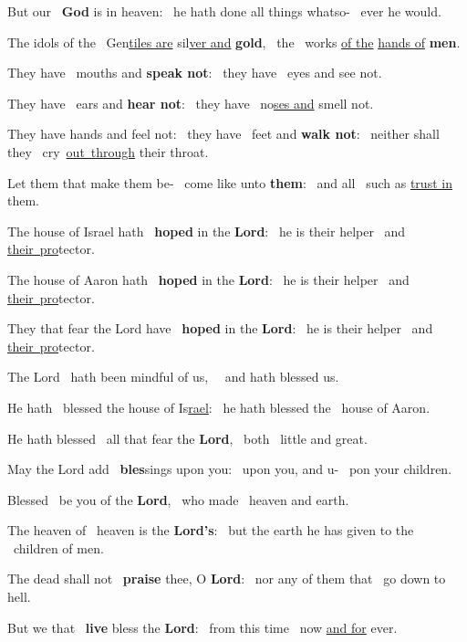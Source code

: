 \documentclass[12pt]{article} %
\newenvironment{psalmtext}{\leftskip 0.25in}{\vspace{2 mm}}
\def\pipe{\textcolor{benred8}{\textdoublepipe}}
\let\oldgresixstar\gresixstar
\renewcommand{\gresixstar}{\textcolor{benred8}{\oldgresixstar}}
\let\oldgredagger\gredagger
\renewcommand{\gredagger}{\textcolor{benred8}{\oldgredagger}}
\begin{document}
\begin{pages}
\begin{Rightside}
\begin{psalmtext}
But our \pipe\ \textbf{God} is in heaven: \gresixstar\ he hath done all things whatso- \pipe\ ever he would.

The idols of the \pipe\ Gen\uline{tiles are} sil\uline{ver and} \textbf{gold}, \gresixstar\ the \pipe\ works \uline{of the} \uline{hands of} \textbf{men}.

They have \pipe\ mouths and \textbf{speak not}: \gresixstar\ they have \pipe\ eyes and see not.

They have \pipe\ ears and \textbf{hear not}: \gresixstar\ they have \pipe\ no\uline{ses and} smell not.

They have hands and feel not: \gredagger\ they have \pipe\ feet and \textbf{walk not}: \gresixstar\ neither shall they \pipe\ cry~\uline{out~through} their throat.

Let them that make them be- \pipe\ come like unto \textbf{them}: \gresixstar\ and all \pipe\ such as \uline{trust in} them.

The house of Israel hath \pipe\ \textbf{hoped} in the \textbf{Lord}: \gresixstar\ he is their helper \pipe\ and \uline{their~pro}tector.

The house of Aaron hath \pipe\ \textbf{hoped} in the \textbf{Lord}: \gresixstar\ he is their helper \pipe\ and \uline{their~pro}tector.

They that fear the Lord have \pipe\ \textbf{hoped} in the \textbf{Lord}: \gresixstar\ he is their helper \pipe\ and \uline{their~pro}tector.

The Lord \pipe\ hath been mindful of us, \gresixstar\ \pipe\ and hath blessed us.

He hath \pipe\ blessed the house of Is\uline{rael}: \gresixstar\ he hath blessed the \pipe\ house of Aaron.

He hath blessed \pipe\ all that fear the \textbf{Lord}, \gresixstar\ both \pipe\ little and great.

May the Lord add \pipe\ \textbf{bles}sings upon you: \gresixstar\ upon you, and u- \pipe\ pon your children.

Blessed \pipe\ be you of the \textbf{Lord}, \gresixstar\ who made \pipe\ heaven and earth.

The heaven of \pipe\ heaven is the \textbf{Lord's}: \gresixstar\ but the earth he has given to the \pipe\ children of men.

The dead shall not \pipe\ \textbf{praise} thee, O \textbf{Lord}: \gresixstar\ nor any of them that \pipe\ go down to hell.

But we that \pipe\ \textbf{live} bless the \textbf{Lord}: \gresixstar\ from this time \pipe\ now \uline{and for} ever.


\end{psalmtext}
\end{Rightside}
\end{pages}
\end{document}
